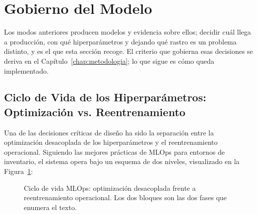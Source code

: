 \section{Gobierno del Modelo}
\label{sec:gobierno_modelo}

Los modos anteriores producen modelos y evidencia sobre ellos; decidir cuál llega a producción, con qué hiperparámetros y dejando qué rastro es un problema distinto, y es el que esta sección recoge. El criterio que gobierna esas decisiones se deriva en el Capítulo~\ref{chap:metodologia}; lo que sigue es cómo queda implementado.

\subsection{Ciclo de Vida de los Hiperparámetros: Optimización vs. Reentrenamiento}
\label{sec:mlops_workflow}

Una de las decisiones críticas de diseño ha sido la separación entre la optimización desacoplada de los hiperparámetros y el reentrenamiento operacional. Siguiendo las mejores prácticas de MLOps para entornos de inventario, el sistema opera bajo un esquema de dos niveles, visualizado en la Figura~\ref{fig:mlops_flow}:

\begin{figure}[h]
    \centering
    \caption[Ciclo de vida MLOps]{Ciclo de vida MLOps: optimización desacoplada frente a reentrenamiento operacional. Los dos bloques son las dos fases que enumera el texto.}
    \label{fig:mlops_flow}
\end{figure}

